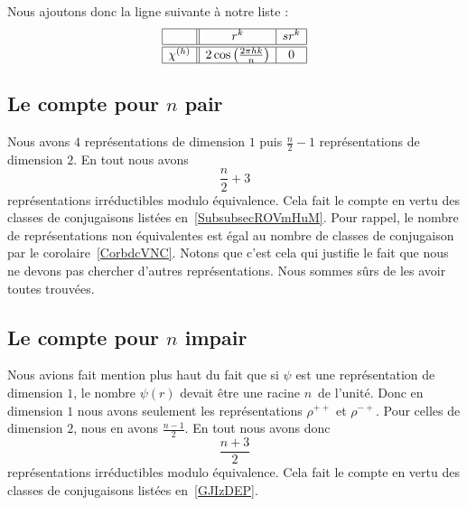 Nous ajoutons donc la ligne suivante à notre liste :
\begin{equation*}
    \begin{array}[]{|c||c|c|}
        \hline
        &r^k&sr^k\\
        \hline\hline
        \chi^{(h)}&2\cos\left( \frac{ 2\pi hk }{ n } \right)&0\\
        \hline
    \end{array}
\end{equation*}

\subsection{Le compte pour \texorpdfstring{$ n$}{n} pair}

Nous avons \( 4\) représentations de dimension \( 1\) puis \( \frac{ n }{2}-1\) représentations de dimension \( 2\). En tout nous avons
\begin{equation}
 \frac{ n }{2}+3
\end{equation}
représentations irréductibles modulo équivalence. Cela fait le compte en vertu des classes de conjugaisons listées en~\ref{SubsubsecROVmHuM}. Pour rappel, le nombre de représentations non équivalentes est égal au nombre de classes de conjugaison par le corolaire~\ref{CorbdcVNC}. Notons que c'est cela qui justifie le fait que nous ne devons pas chercher d'autres représentations. Nous sommes sûrs de les avoir toutes trouvées.

\subsection{Le compte pour \texorpdfstring{$ n$}{n} impair}

Nous avions fait mention plus haut du fait que si \( \psi\) est une représentation de dimension \( 1\), le nombre \( \psi(r)\) devait être une racine \( n\)\ieme\ de l'unité. Donc en dimension \( 1\) nous avons seulement les représentations \( \rho^{++}\) et \( \rho^{-+}\). Pour celles de dimension \( 2\), nous en avons \( \frac{ n-1 }{2}\). En tout nous avons donc
\begin{equation}
    \frac{ n+3 }{2}
\end{equation}
représentations irréductibles modulo équivalence. Cela fait le compte en vertu des classes de conjugaisons listées en~\ref{GJIzDEP}.
